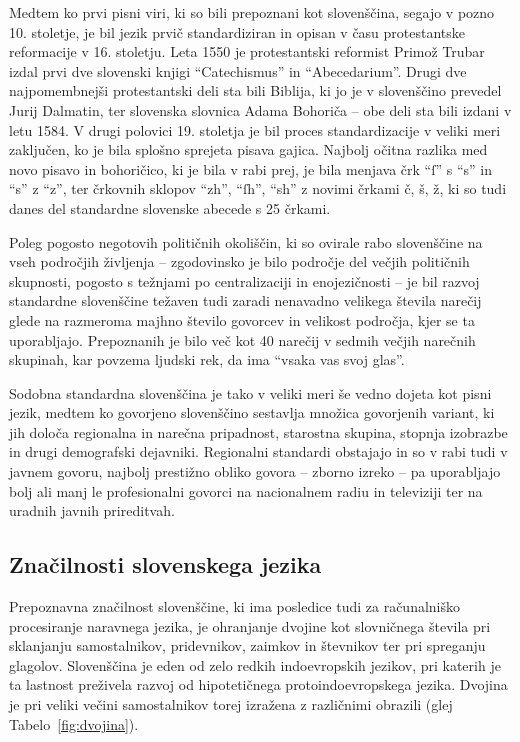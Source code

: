 \begin{multicols}{2}
Medtem ko prvi pisni viri, ki so bili prepoznani kot slovenščina, segajo v pozno 10. stoletje, je bil jezik prvič standardiziran in opisan v času protestantske reformacije v 16. stoletju. Leta 1550 je protestantski reformist Primož Trubar izdal prvi dve slovenski knji\-gi “Catechismus” in “Abecedarium”. Drugi dve naj\-pomembnejši protestantski deli sta bili Biblija, ki jo je v slovenščino prevedel Jurij Dalmatin, ter slovenska slovnica Adama Bohoriča – obe deli sta bili izdani v letu 1584. 
V drugi polovici 19. stoletja je bil proces standardizacije v veliki meri zaključen, ko je bila splošno sprejeta pisava gajica. Naj\-bolj očitna razlika med novo pisavo in bohoričico, ki je bila v rabi prej, je bila menjava črk “ſ” s “s” in “s” z “z”, ter črkovnih sklopov “zh”, “ſh”, “sh” z novimi črkami č, š, ž, ki so tudi danes del standardne slovenske abecede s 25 črkami.

Poleg pogosto negotovih političnih okoliščin, ki so ovirale rabo slovenščine na vseh področjih živ\-ljenja – zgodovinsko je bilo področje del večjih političnih skupnosti, pogosto s težnjami po centra\-lizaciji in enojezičnosti – je bil razvoj standardne slovenščine težaven tudi zaradi nenavadno velikega števila narečij glede na razmeroma majhno število go\-vorcev in velikost področja, kjer se ta uporab\-ljajo. Prepoznanih je bilo več kot 40 narečij v sedmih večjih narečnih skupinah, kar povzema ljudski rek, da ima “vsaka vas svoj glas”. 


Sodobna standardna slovenščina je tako v veliki meri še vedno dojeta kot pisni jezik, medtem ko go\-vorjeno slovenščino sestav\-lja množica go\-vorjenih variant, ki jih določa regionalna in narečna pripadnost, starostna skupina, stopnja izobrazbe in drugi demografski dejavniki. Regionalni standardi obstajajo in so v rabi tudi v javnem go\-voru, naj\-bolj prestižno obliko go\-vora – zborno izreko – pa uporab\-ljajo bolj ali manj le profesionalni go\-vorci na nacionalnem radiu in televiziji ter na uradnih javnih prireditvah. 

\subsection{Značilnosti slovenskega jezika}

Prepoznavna značilnost slovenščine, ki ima posledice tudi za računalniško procesiranje narav\-nega jezika, je ohranjanje dvojine kot slovničnega števila pri sklanjanju samostalnikov, pridevnikov, zaimkov in števnikov ter pri spreganju glagolov. Slovenščina je eden od zelo redkih indoevropskih jezikov, pri katerih je ta lastnost preživela razvoj od hipotetičnega protoindoevropskega jezika. Dvojina je pri veliki večini samostalnikov torej izražena z različnimi obrazili (glej Tabelo~\ref{fig:dvojina}).


\end{multicols}
